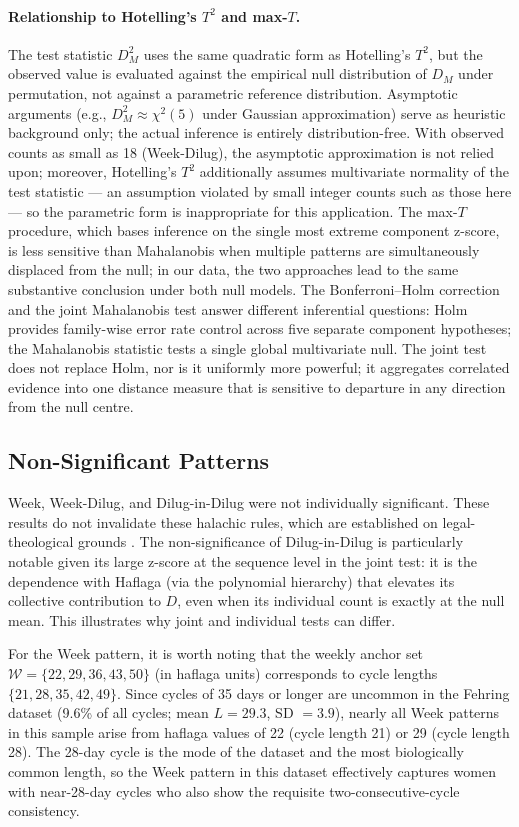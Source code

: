 \documentclass[12pt]{article}
\begin{document}
\paragraph{Relationship to Hotelling's $T^2$ and max-$T$.}
The test statistic $D_M^2$ uses the same quadratic form as Hotelling's $T^2$, but
the observed value is evaluated against the empirical null distribution of $D_M$
under permutation, not against a parametric reference distribution. Asymptotic
arguments (e.g., $D_M^2 \approx \chi^2(5)$ under Gaussian approximation) serve as
heuristic background only; the actual inference is entirely distribution-free. With
observed counts as small as 18 (Week-Dilug), the asymptotic approximation is not
relied upon; moreover, Hotelling's $T^2$ additionally assumes multivariate normality
of the test statistic --- an assumption violated by small integer counts such as those
here --- so the parametric form is inappropriate for this application.
The max-$T$ procedure, which bases inference on the single most extreme component
z-score, is less sensitive than Mahalanobis when multiple patterns are simultaneously
displaced from the null; in our data, the two approaches lead to the same substantive
conclusion under both null models.
The Bonferroni--Holm correction and the joint Mahalanobis test answer
different inferential questions: Holm provides family-wise error rate control across
five separate component hypotheses; the Mahalanobis statistic tests a single global
multivariate null. The joint test does not replace Holm, nor is it uniformly more
powerful; it aggregates correlated evidence into one distance measure that is
sensitive to departure in any direction from the null centre.

\subsection{Non-Significant Patterns}

Week, Week-Dilug, and Dilug-in-Dilug were not individually significant. These results
do not invalidate these halachic rules, which are established on legal-theological
grounds \cite{anon2021statistical}. The non-significance of Dilug-in-Dilug is
particularly notable given its large z-score at the sequence level in the joint test:
it is the dependence with Haflaga (via the polynomial hierarchy) that elevates its
collective contribution to $D$, even when its individual count is exactly at the null
mean. This illustrates why joint and individual tests can differ.

For the Week pattern, it is worth noting that the weekly anchor set
$\mathcal{W} = \{22, 29, 36, 43, 50\}$ (in haflaga units) corresponds to cycle lengths
$\{21, 28, 35, 42, 49\}$. Since cycles of 35 days or longer are uncommon in the Fehring dataset
(9.6\% of all cycles; mean $L = 29.3$, SD $= 3.9$), nearly all
Week patterns in this sample arise from haflaga values of 22 (cycle length 21) or 29
(cycle length 28). The 28-day cycle is the mode of the dataset and the most
biologically common length, so the Week pattern in this dataset effectively captures
women with near-28-day cycles who also show the requisite two-consecutive-cycle
consistency.
\end{document}

